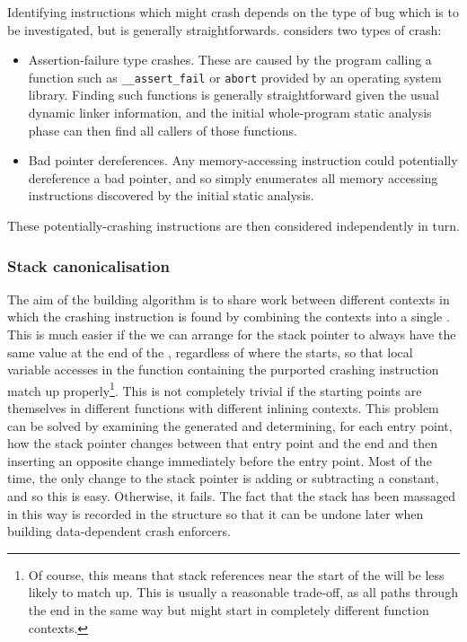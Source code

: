 Identifying instructions which might crash depends on the type of bug
which is to be investigated, but is generally straightforwards.
{\Implementation} considers two types of crash:

\begin{itemize}
\item Assertion-failure type crashes.  These are caused by the program
  calling a function such as \verb|__assert_fail| or \verb|abort|
  provided by an operating system library.  Finding such functions is
  generally straightforward given the usual dynamic linker
  information, and the initial whole-program static analysis phase can
  then find all callers of those functions.
\item Bad pointer dereferences.  Any memory-accessing instruction
  could potentially dereference a bad pointer, and so
  {\implementation} simply enumerates all memory accessing
  instructions discovered by the initial static analysis.
\end{itemize}

These potentially-crashing instructions are then considered
independently in turn.

\subsubsection{Stack canonicalisation}

The aim of the {\StateMachine} building algorithm is to share work
between different contexts in which the crashing instruction is found
by combining the contexts into a single {\StateMachine}.  This is much
easier if the we can arrange for the stack pointer to always have the
same value at the end of the {\StateMachine}, regardless of where the
{\StateMachine} starts, so that local variable accesses in the
function containing the purported crashing instruction match up
properly\footnote{Of course, this means that stack references near the
  start of the {\StateMachine} will be less likely to match up.  This
  is usually a reasonable trade-off, as all paths through the
  {\StateMachine} end in the same way but might start in completely
  different function contexts.}.  This is not completely trivial if
the starting points are themselves in different functions with
different inlining contexts.  This problem can be solved by examining
the generated {\StateMachine} and determining, for each entry point,
how the stack pointer changes between that entry point and the end and
then inserting an opposite change immediately before the entry point.
Most of the time, the only change to the stack pointer is adding or
subtracting a constant, and so this is easy.  Otherwise, it fails.
The fact that the stack has been massaged in this way is recorded in
the {\StateMachine} structure so that it can be undone later when
building data-dependent crash enforcers.

